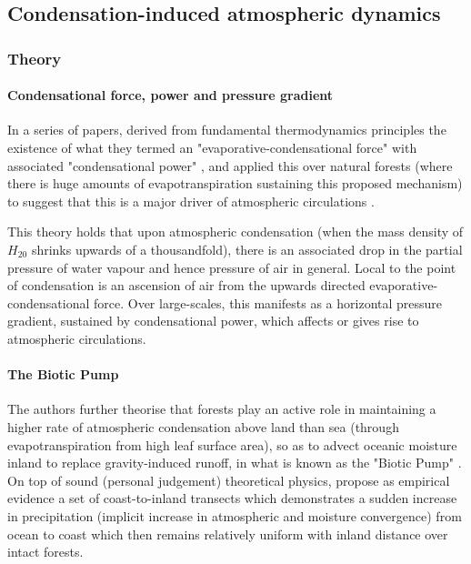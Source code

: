 \subsection{Condensation-induced atmospheric dynamics}
\label{ssec:lit_ciad}

\subsubsection{Theory}

\paragraph{Condensational force, power and pressure gradient}

In a series of papers, \citet{makarieva2009} derived from fundamental thermodynamics principles the existence of what they termed an "evaporative-condensational force" \citep{makarieva2010} with associated "condensational power" \citep{makarieva2014}, and applied this over natural forests (where there is huge amounts of evapotranspiration sustaining this proposed mechanism) to suggest that this is a major driver of atmospheric circulations \citep{makarieva2013}.

This theory holds that upon atmospheric condensation (when the mass density of $H_20$ shrinks upwards of a thousandfold), there is an associated drop in the partial pressure of water vapour and hence pressure of air in general. Local to the point of condensation is an ascension of air from the upwards directed evaporative-condensational force. Over large-scales, this manifests as a horizontal pressure gradient, sustained by condensational power, which affects or gives rise to atmospheric circulations.

\paragraph{The Biotic Pump}

The authors further theorise that forests play an active role in maintaining a higher rate of atmospheric condensation above land than sea (through evapotranspiration from high leaf surface area), so as to advect oceanic moisture inland to replace gravity-induced runoff, in what is known as the "Biotic Pump" \citep{makarieva2009_evidence, makarieva2013_revisiting}. On top of sound (personal judgement) theoretical physics, \citet{makarieva2009_evidence, makarieva2013_revisiting} propose as empirical evidence a set of coast-to-inland transects which demonstrates a sudden increase in precipitation (implicit increase in atmospheric and moisture convergence) from ocean to coast which then remains relatively uniform with inland distance over intact forests. 

